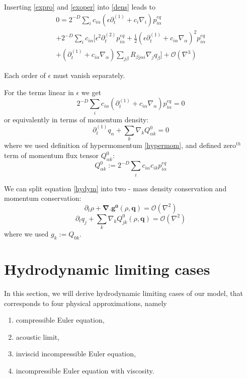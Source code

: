 Inserting \ref{expro} and \ref{exoper} into \ref{dens} leads to
\begin{equation}
\begin{split}
0 = 2^{-D} \sum_i c_{i\alpha}(\epsilon\partial_{t}^{(1)} + c_i \nabla_i) p_{i\alpha}^{eq} \\
+ 2^{-D} \sum_i c_{i\alpha}\big[\epsilon^2 \partial_t^{(2)} p_{i\alpha}^{eq} + \frac{1}{2}(\epsilon \partial_t^{(1)} + c_{i\alpha} \nabla_{\alpha})^2 p_{i\alpha}^{eq} \\
+ (\partial_t^{(1)} + c_{i\alpha} \nabla_{\alpha})\sum_{j \beta} R_{\beta j \alpha i}\nabla_{j}q_{\beta} \big] + \mathcal{O}(\nabla^3)
\end{split}
\end{equation}

Each order of $\epsilon$ must vanish separately.

For the terms linear in $\epsilon$ we get
\begin{equation}
2^{-D} \sum_i c_{i\alpha}(\partial_{t}^{(1)} + c_{i\alpha} \nabla_{\alpha}) p_{i\alpha}^{eq} = 0
\end{equation} \label{hydym}
or equivalently in terms of momentum density:
\begin{equation}
\partial_t^{(1)} q_{\alpha} + \sum_k \nabla_k Q_{\alpha k}^0 = 0
\end{equation}
where we used definition of hypermomentum \ref{hypermom},
and defined zero$^{th}$ term of momentum flux tensor $Q_{\alpha k}^0$:
\begin{equation}
Q_{\alpha k}^0 := 2^{-D} \sum_i c_{i\alpha}c_{i k} p_{i\alpha}^{eq}
\end{equation}

We can split equation \ref{hydym} into two -  mass density conservation and momentum conservation:
\begin{equation} \label{hyd1}
\partial_t \rho + \bm{\nabla . g^0}(\rho, \bm{q}) = \mathcal{O}(\nabla^2)
\end{equation}
\begin{equation}
\partial_t q_j + \sum_k \nabla_kQ_{jk}^0(\rho, \bm{q}) = \mathcal{O}(\nabla^2)
\end{equation}
where we used $g_k := Q_{0k}$.

\section{Hydrodynamic limiting cases}
In this section, we will derive hydrodynamic limiting cases of our model, that corresponds to four physical approximations,
namely
\begin{enumerate}
\item compressible Euler equation,
\item acoustic  limit,
\item inviscid incompressible Euler equation,
\item incompressible Euler equation with viscosity.
\end{enumerate}

